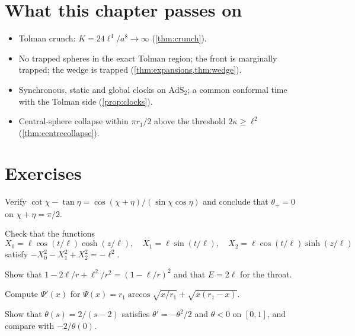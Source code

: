 \section*{What this chapter passes on}
\begin{itemize}[nosep]
\item Tolman crunch: $K=24\ell^4/a^8\to\infty$ (\cref{thm:crunch}).
\item No trapped spheres in the exact Tolman region; the front is marginally trapped; the wedge is trapped (\cref{thm:expansions,thm:wedge}).
\item Synchronous, static and global clocks on $\mathrm{AdS}_2$; a common conformal time with the Tolman side (\cref{prop:clocks}).
\item Central-sphere collapse within $\pi r_1/2$ above the threshold $2\kappa\ge\ell^2$ (\cref{thm:centrecollapse}).
\end{itemize}

\section*{Exercises}
\begin{exercise}
Verify $\cot\chi-\tan\eta=\cos(\chi+\eta)/(\sin\chi\cos\eta)$ and conclude that $\theta_+=0$ on $\chi+\eta=\pi/2$.
\end{exercise}
\begin{exercise}
Check that the functions
\[
X_0=\ell\cos(t/\ell)\cosh(z/\ell),\quad X_1=\ell\sin(t/\ell),\quad X_2=\ell\cos(t/\ell)\sinh(z/\ell)
\]
satisfy $-X_0^2-X_1^2+X_2^2=-\ell^2$.
\end{exercise}
\begin{exercise}
Show that $1-2\ell/r+\ell^2/r^2=(1-\ell/r)^2$ and that $E=2\ell$ for the throat.
\end{exercise}
\begin{exercise}
Compute $\Psi'(x)$ for $\Psi(x)=r_1\arccos\sqrt{x/r_1}+\sqrt{x(r_1-x)}$.
\end{exercise}
\begin{exercise}
Show that $\theta(s)=2/(s-2)$ satisfies $\theta'=-\theta^2/2$ and $\theta<0$ on $[0,1]$, and compare with $-2/\theta(0)$.
\end{exercise}

